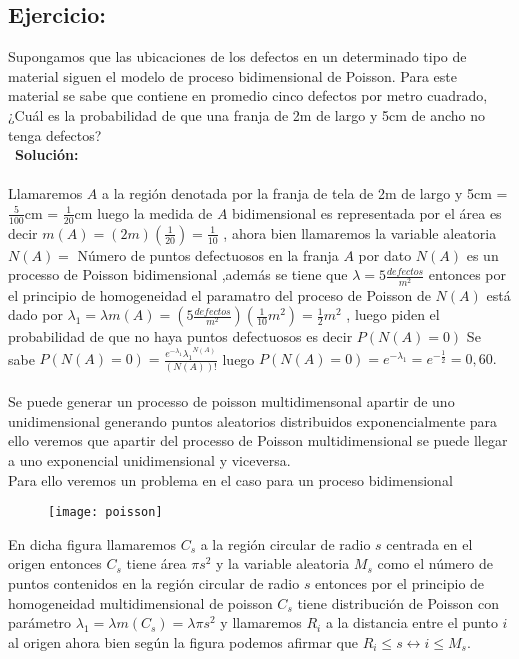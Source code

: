 \documentclass{article}
\begin{document}
\subsection{Ejercicio:}
Supongamos que las ubicaciones de los defectos en un determinado tipo de material siguen el modelo de proceso bidimensional de Poisson. Para este material se sabe que contiene en promedio cinco defectos por metro cuadrado, ¿Cuál es la probabilidad de que  una franja de 2m de largo y 5cm de ancho no tenga defectos?\\\
{\bf Solución:}\\\\
Llamaremos $A$ a la región denotada por la franja de tela de 2m de largo y 5cm = $\frac{5}{100}$cm = $\frac{1}{20}$cm luego la medida de $A$ bidimensional es representada por el área es decir $m(A) = (2m)(\frac{1}{20}) = \frac{1}{10}$ , ahora bien llamaremos la variable aleatoria $N(A) =$ Número de puntos defectuosos en la franja $A$ por dato $N(A)$ es un processo de Poisson bidimensional ,además se tiene que $\lambda = 5\frac{defectos}{m^2}$ entonces por el principio de homogeneidad el paramatro del proceso de Poisson de $N(A)$ está dado por $\lambda_1 = \lambda m(A) = (5\frac{defectos}{m^2})(\frac{1}{10}m^2) = \frac{1}{2}m^2$ , luego piden el probabilidad de que no haya puntos defectuosos es decir $P(N(A) =0)$ Se sabe $P(N(A)=0) = \frac{e^{-\lambda_1}{\lambda_1}^{N(A)}}{(N(A))!}$ luego $P(N(A)=0) = e^{-\lambda_1} = e^{-\frac{1}{2}} = 0,60.$\\\\
Se puede generar un processo de poisson multidimensonal apartir de uno unidimensional generando puntos aleatorios distribuidos exponencialmente para ello veremos que apartir del processo de Poisson multidimensional se puede llegar a uno exponencial unidimensional y viceversa.\\
Para ello veremos un problema en el caso para un proceso bidimensional
\begin{figure}[h!]
\centering
\texttt{[image: poisson]}
\end{figure}
En dicha figura llamaremos $C_s$ a la región circular de radio $s$ centrada en el origen entonces $C_s$ tiene área $\pi s^2$  y la variable aleatoria $M_s$ como el número de puntos contenidos en la región circular de radio $s$ entonces por el principio de homogeneidad multidimensional de poisson $C_s$ tiene distribución de Poisson con parámetro $\lambda_1 =\lambda m(C_s) = \lambda\pi s^2 $ y llamaremos $R_i$ a la distancia entre el punto $i$ al origen ahora bien según la figura podemos afirmar que $R_i \leq s \leftrightarrow i \leq M_s$.\\
\end{document}
